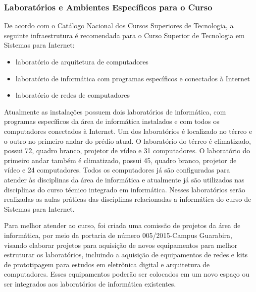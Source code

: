 \subsubsection{Laborat\'orios e Ambientes Espec\'ificos para o Curso}

	
	De acordo com o Catálogo Nacional dos Cursos Superiores de Tecnologia, a seguinte infraestrutura é recomendada para o Curso Superior de Tecnologia em Sistemas para Internet:
	
\begin{itemize}
	\item laboratório de arquitetura de computadores
	\item laboratório de informática com programas específicos e conectados à Internet 
	\item laboratório de redes de computadores
\end{itemize}

	Atualmente as instalações possuem dois laboratórios de informática, com programas específicos da área de informática instalados e com todos os computadores conectados à Internet. Um dos laboratórios é localizado no térreo e o outro no primeiro andar do prédio atual. O laboratório do térreo é climatizado, possui \unit{72}{\squaremetre}, quadro branco, projetor de vídeo e 31 computadores. O laboratório do primeiro andar também é climatizado, possui \unit{45}{\squaremetre}, quadro branco, projetor de vídeo e 24 computadores. Todos os computadores já são configuradas para atender às disciplinas da área de informática e atualmente já são utilizados nas disciplinas do curso técnico integrado em informática. Nesses laboratórios serão realizadas as aulas práticas das disciplinas relacionadas a informática do curso de Sistemas para Internet.
	
	Para melhor atender ao curso, foi criada uma comissão de projetos da área de informática, por meio da portaria de número 005/2015-Campus Guarabira, visando elaborar projetos para aquisição de novos equipamentos para melhor estruturar os laboratórios, incluindo a aquisição de equipamentos de redes e kits de prototipagem para estudos em eletrônica digital e arquitetura de computadores. Esses equipamentos poderão ser colocados em um novo espaço ou ser integrados aos laboratórios de informática existentes.




